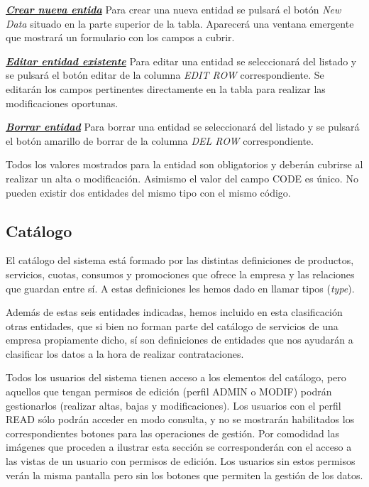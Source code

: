\underline{\textsl{\textbf{Crear nueva entida}}}\newline
Para crear una nueva entidad se pulsará el botón \textit{New Data} situado en la parte superior de la tabla. Aparecerá una ventana emergente que mostrará un formulario con los campos a cubrir.


\underline{\textsl{\textbf{Editar entidad existente}}}\newline
Para editar una entidad se seleccionará del listado y se pulsará el botón editar de la columna \textit{EDIT ROW} correspondiente. Se editarán los campos pertinentes directamente en la tabla para realizar las modificaciones oportunas. 

\underline{\textsl{\textbf{Borrar entidad}}}\newline
Para borrar una entidad se seleccionará del listado y se pulsará el botón amarillo de borrar de la columna \textit{DEL ROW} correspondiente.\newline

Todos los valores mostrados para la entidad son obligatorios y deberán cubrirse al realizar un alta o modificación. Asimismo el valor del campo CODE es único. No pueden existir dos entidades del mismo tipo con el mismo código.


\subsection{Catálogo}
\label{sub:catálogo}

El catálogo del sistema está formado por las distintas definiciones de productos, servicios, cuotas, consumos y promociones que ofrece la empresa y las relaciones que guardan entre sí. A estas definiciones les hemos dado en llamar tipos (\textit{type}).

Además de estas seis entidades indicadas, hemos incluido en esta clasificación otras entidades, que si bien no forman parte del catálogo de servicios de una empresa propiamente dicho, sí son definiciones de entidades que nos ayudarán a clasificar los datos a la hora de realizar contrataciones.


Todos los usuarios del sistema tienen acceso a los elementos del catálogo, pero aquellos que tengan permisos de edición (perfil ADMIN o MODIF) podrán gestionarlos (realizar altas, bajas y modificaciones). Los usuarios con el perfil READ sólo podrán acceder en modo consulta, y no se mostrarán habilitados los correspondientes botones para las operaciones de gestión. Por comodidad las imágenes que proceden a ilustrar esta sección se corresponderán con el acceso a las vistas de un usuario con permisos de edición. Los usuarios sin estos permisos verán la misma pantalla pero sin los botones que permiten la gestión de los datos.


